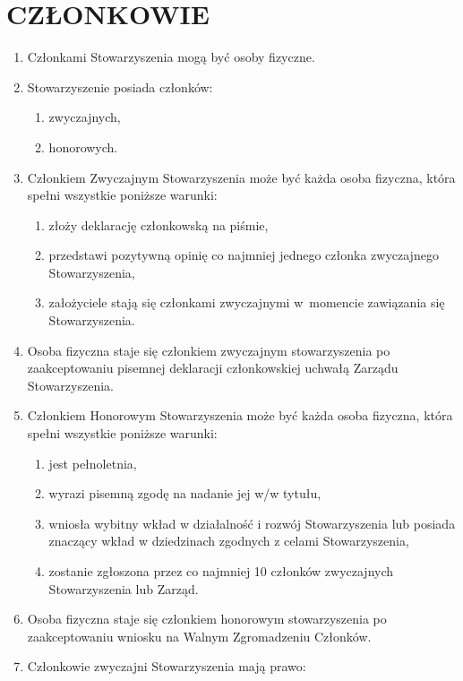 \documentclass{article}
\begin{document}
\section{CZŁONKOWIE}
  \begin{enumerate}
    \item Członkami Stowarzyszenia mogą być osoby fizyczne.
    \item Stowarzyszenie posiada członków:
      \begin{enumerate}
        \item zwyczajnych,
        \item honorowych.
      \end{enumerate}
    \item Członkiem Zwyczajnym Stowarzyszenia może być każda osoba fizyczna, która spełni wszystkie poniższe warunki:
      \begin{enumerate}
        \item złoży deklarację członkowską na piśmie,
        \item przedstawi pozytywną opinię co najmniej jednego członka zwyczajnego Stowarzyszenia,
        \item założyciele stają się członkami zwyczajnymi w~momencie zawiązania się Stowarzyszenia.
      \end{enumerate}
    \item Osoba fizyczna staje się członkiem zwyczajnym stowarzyszenia po zaakceptowaniu pisemnej deklaracji członkowskiej uchwałą Zarządu Stowarzyszenia.
    \item Członkiem Honorowym Stowarzyszenia może być każda osoba fizyczna, która spełni wszystkie poniższe warunki:
      \begin{enumerate}
        \item jest pełnoletnia,
        \item wyrazi pisemną zgodę na nadanie jej w/w tytułu,
        \item wniosła wybitny wkład w działalność i rozwój Stowarzyszenia lub posiada znaczący wkład w dziedzinach zgodnych z celami Stowarzyszenia,
        \item zostanie zgłoszona przez co najmniej 10 członków zwyczajnych Stowarzyszenia lub Zarząd.
      \end{enumerate}
    \item Osoba fizyczna staje się członkiem honorowym stowarzyszenia po zaakceptowaniu wniosku na Walnym Zgromadzeniu Członków.
    \item Członkowie zwyczajni Stowarzyszenia mają prawo:
      \begin{enumerate}

\end{enumerate}
\end{enumerate}
\end{document}
